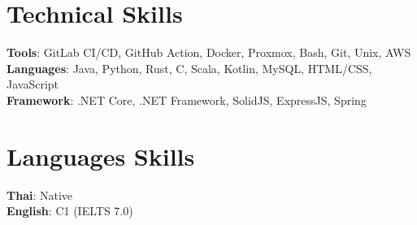 \documentclass[letterpaper,11pt]{article}
\makeatletter
\newcommand{\resumeItem}[1]{
  \item\small{
    {#1 \vspace{-2pt}}
  }
}
\newcommand{\resumeProjectHeading}[2]{
    \item
    \begin{tabular*}{0.97\textwidth}{l@{\extracolsep{\fill}}r}
      \small#1 & #2 \\
    \end{tabular*}\vspace{-7pt}
}
\newcommand{\resumeSubHeadingListStart}{\begin{itemize}[leftmargin=0.15in, label={}]}
\newcommand{\resumeSubHeadingListEnd}{\end{itemize}}
\newcommand{\resumeItemListStart}{\begin{itemize}}
\newcommand{\resumeItemListEnd}{\end{itemize}\vspace{-5pt}}
\makeatother
\begin{document}
\section{Technical Skills}
  \begin{itemize}[leftmargin=0.15in, label={}]
    \small{\item{
      \textbf{Tools}{: GitLab CI/CD, GitHub Action, Docker, Proxmox, Bash, Git, Unix, AWS} \\
      \textbf{Languages}{: Java, Python, Rust, C, Scala, Kotlin, MySQL, HTML/CSS, JavaScript} \\
      \textbf{Framework}{: .NET Core, .NET Framework, SolidJS, ExpressJS, Spring}
    }}
  \end{itemize}


\section{Languages Skills}
 \begin{itemize}[leftmargin=0.15in, label={}]
    \small{\item{
     \textbf{Thai}{: Native} \\
     \textbf{English}{: C1 (IELTS 7.0)} \\
    }}
 \end{itemize}


\end{document}
